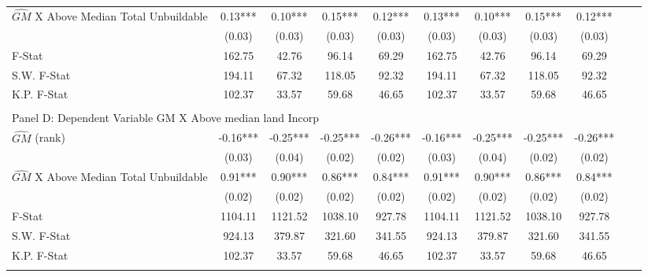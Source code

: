 \begin{table}[htbp]
\begin{threeparttable}
\begin{tabular}{l*{10}{c}}
\addlinespace
$\hat{GM}$ X Above Median Total Unbuildable&       0.13***&       0.10***&       0.15***&       0.12***&       0.13***&       0.10***&       0.15***&       0.12***\\
                &     (0.03)   &     (0.03)   &     (0.03)   &     (0.03)   &     (0.03)   &     (0.03)   &     (0.03)   &     (0.03)   \\
\midrule
F-Stat          &     162.75   &      42.76   &      96.14   &      69.29   &     162.75   &      42.76   &      96.14   &      69.29   \\
S.W. F-Stat     &     194.11   &      67.32   &     118.05   &      92.32   &     194.11   &      67.32   &     118.05   &      92.32   \\
K.P. F-Stat     &     102.37   &      33.57   &      59.68   &      46.65   &     102.37   &      33.57   &      59.68   &      46.65   \\
\cmidrule[\heavyrulewidth](lr){1-9} \\ \cmidrule[\heavyrulewidth](lr){1-9}
\multicolumn{8}{l}{Panel D: Dependent Variable GM X Above median land Incorp}\\
\cmidrule(lr){1-9}
$\hat{GM}$ (rank)&      -0.16***&      -0.25***&      -0.25***&      -0.26***&      -0.16***&      -0.25***&      -0.25***&      -0.26***\\
                &     (0.03)   &     (0.04)   &     (0.02)   &     (0.02)   &     (0.03)   &     (0.04)   &     (0.02)   &     (0.02)   \\
\addlinespace
$\hat{GM}$ X Above Median Total Unbuildable&       0.91***&       0.90***&       0.86***&       0.84***&       0.91***&       0.90***&       0.86***&       0.84***\\
                &     (0.02)   &     (0.02)   &     (0.02)   &     (0.02)   &     (0.02)   &     (0.02)   &     (0.02)   &     (0.02)   \\
\midrule
F-Stat          &    1104.11   &    1121.52   &    1038.10   &     927.78   &    1104.11   &    1121.52   &    1038.10   &     927.78   \\
S.W. F-Stat     &     924.13   &     379.87   &     321.60   &     341.55   &     924.13   &     379.87   &     321.60   &     341.55   \\
K.P. F-Stat     &     102.37   &      33.57   &      59.68   &      46.65   &     102.37   &      33.57   &      59.68   &      46.65   \\
\cmidrule[\heavyrulewidth](lr){1-9} \\ \cmidrule[\heavyrulewidth](lr){1-9}

\end{tabular}
\end{threeparttable}
\end{table}
